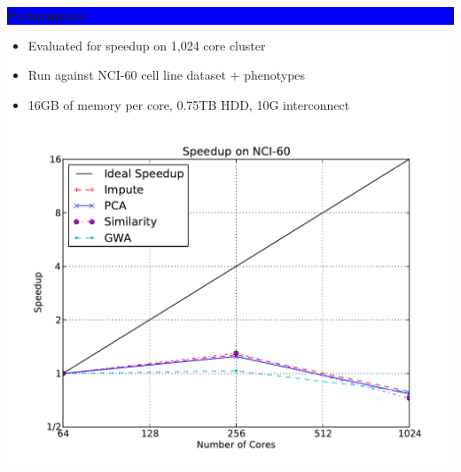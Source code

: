 \documentclass[11pt]{a0poster}
\begin{document}
{\begin{minipage}[t][2045pt][t]{\linewidth}
\begin{minipage}{0.3\linewidth}
\vspace{75pt}
\colorbox{Blue}{
\begin{minipage}{\linewidth}
\vspace{25pt}
\begin{center}
\Huge \bf \color{White} Performance
\end{center}
\vspace{10pt}
\end{minipage}
}
\colorbox{White}{
\begin{minipage}[t][920pt][t]{\linewidth}
\color{Blue}
\vspace{20pt}
\LARGE
\begin{itemize}
\item Evaluated for speedup on 1,024 core cluster
\item Run against NCI-60 cell line dataset + phenotypes
\item 16GB of memory per core, 0.75TB HDD, 10G interconnect
\end{itemize}
\begin{center}
\includegraphics[width=0.95\linewidth]{graphs/speedup.pdf}
\end{center}
\pagebreak
\end{minipage}
}
\pagebreak
\end{minipage}
\begin{minipage}{0.03\linewidth}
\hfill
\pagebreak
\end{minipage}
\begin{minipage}{0.6\linewidth}


\end{minipage}
\end{minipage}}
\end{document}
